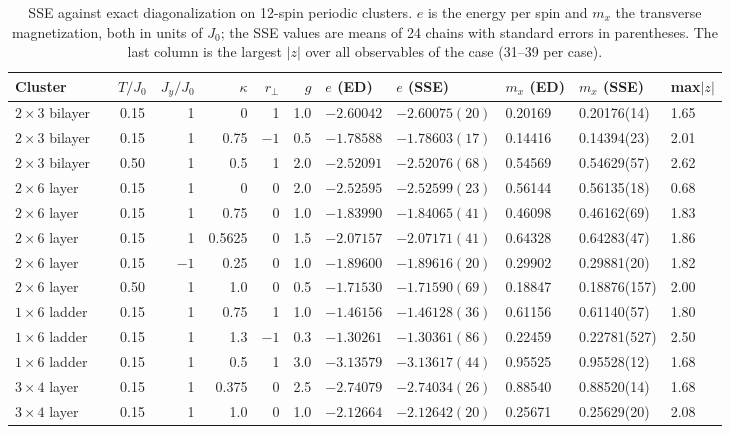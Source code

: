 \documentclass[aps,prb,twocolumn,superscriptaddress,floatfix]{revtex4-2}
\newcommand{\rp}{r_\perp}
\begin{document}
\begin{table}
\caption{SSE against exact diagonalization on 12-spin periodic clusters. $e$ is the energy per spin
and $m_x$ the transverse magnetization, both in units of $J_0$; the SSE values are means of 24
chains with standard errors in parentheses. The last column is the largest $|z|$ over all
observables of the case (31--39 per case).}
\label{tab:ed}
\begin{ruledtabular}
\begin{tabular}{llcrrrrlllll}
Cluster & & $T/J_0$ & $J_y/J_0$ & $\kappa$ & $\rp$ & $g$ & $e$ (ED) & $e$ (SSE) & $m_x$ (ED) & $m_x$ (SSE) & max$|z|$ \\
\hline
$2\times3$ bilayer & & 0.15 & 1 & 0 & 1 & 1.0 & $-2.60042$ & $-2.60075(20)$ & 0.20169 & 0.20176(14) & 1.65 \\
$2\times3$ bilayer & & 0.15 & 1 & 0.75 & $-1$ & 0.5 & $-1.78588$ & $-1.78603(17)$ & 0.14416 & 0.14394(23) & 2.01 \\
$2\times3$ bilayer & & 0.50 & 1 & 0.5 & 1 & 2.0 & $-2.52091$ & $-2.52076(68)$ & 0.54569 & 0.54629(57) & 2.62 \\
$2\times6$ layer & & 0.15 & 1 & 0 & 0 & 2.0 & $-2.52595$ & $-2.52599(23)$ & 0.56144 & 0.56135(18) & 0.68 \\
$2\times6$ layer & & 0.15 & 1 & 0.75 & 0 & 1.0 & $-1.83990$ & $-1.84065(41)$ & 0.46098 & 0.46162(69) & 1.83 \\
$2\times6$ layer & & 0.15 & 1 & 0.5625 & 0 & 1.5 & $-2.07157$ & $-2.07171(41)$ & 0.64328 & 0.64283(47) & 1.86 \\
$2\times6$ layer & & 0.15 & $-1$ & 0.25 & 0 & 1.0 & $-1.89600$ & $-1.89616(20)$ & 0.29902 & 0.29881(20) & 1.82 \\
$2\times6$ layer & & 0.50 & 1 & 1.0 & 0 & 0.5 & $-1.71530$ & $-1.71590(69)$ & 0.18847 & 0.18876(157) & 2.00 \\
$1\times6$ ladder & & 0.15 & 1 & 0.75 & 1 & 1.0 & $-1.46156$ & $-1.46128(36)$ & 0.61156 & 0.61140(57) & 1.80 \\
$1\times6$ ladder & & 0.15 & 1 & 1.3 & $-1$ & 0.3 & $-1.30261$ & $-1.30361(86)$ & 0.22459 & 0.22781(527) & 2.50 \\
$1\times6$ ladder & & 0.15 & 1 & 0.5 & 1 & 3.0 & $-3.13579$ & $-3.13617(44)$ & 0.95525 & 0.95528(12) & 1.68 \\
$3\times4$ layer & & 0.15 & 1 & 0.375 & 0 & 2.5 & $-2.74079$ & $-2.74034(26)$ & 0.88540 & 0.88520(14) & 1.68 \\
$3\times4$ layer & & 0.15 & 1 & 1.0 & 0 & 1.0 & $-2.12664$ & $-2.12642(20)$ & 0.25671 & 0.25629(20) & 2.08 \\
\end{tabular}
\end{ruledtabular}
\end{table}
\end{document}
